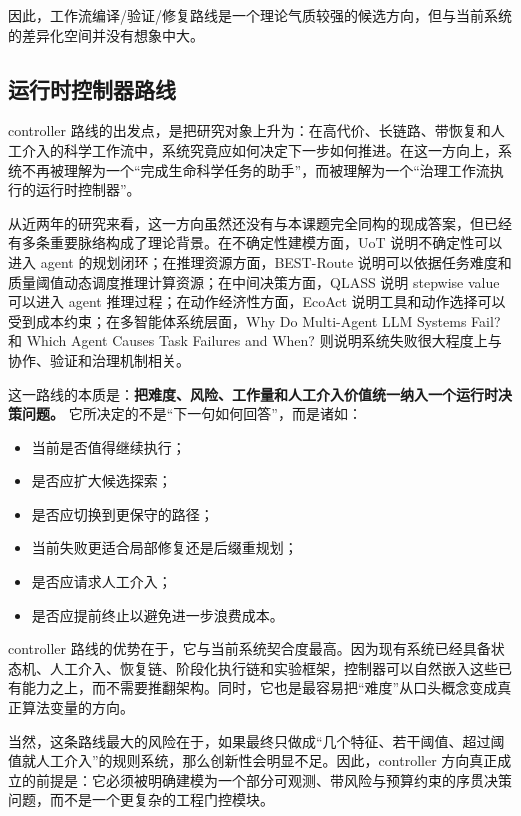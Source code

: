 因此，工作流编译/验证/修复路线是一个理论气质较强的候选方向，但与当前系统的差异化空间并没有想象中大。

\subsection{运行时控制器路线}

controller 路线的出发点，是把研究对象上升为：在高代价、长链路、带恢复和人工介入的科学工作流中，系统究竟应如何决定下一步如何推进。在这一方向上，系统不再被理解为一个“完成生命科学任务的助手”，而被理解为一个“治理工作流执行的运行时控制器”。

从近两年的研究来看，这一方向虽然还没有与本课题完全同构的现成答案，但已经有多条重要脉络构成了理论背景。在不确定性建模方面，UoT 说明不确定性可以进入 agent 的规划闭环\parencite{uot}；在推理资源方面，BEST-Route 说明可以依据任务难度和质量阈值动态调度推理计算资源\parencite{best-route}；在中间决策方面，QLASS 说明 stepwise value 可以进入 agent 推理过程\parencite{qlass}；在动作经济性方面，EcoAct 说明工具和动作选择可以受到成本约束\parencite{ecoact}；在多智能体系统层面，Why Do Multi-Agent LLM Systems Fail? 和 Which Agent Causes Task Failures and When? 则说明系统失败很大程度上与协作、验证和治理机制相关\parencite{whyfail,whichandwhen}。

这一路线的本质是：\textbf{把难度、风险、工作量和人工介入价值统一纳入一个运行时决策问题。} 它所决定的不是“下一句如何回答”，而是诸如：
\begin{itemize}
	\item 当前是否值得继续执行；
	\item 是否应扩大候选探索；
	\item 是否应切换到更保守的路径；
	\item 当前失败更适合局部修复还是后缀重规划；
	\item 是否应请求人工介入；
	\item 是否应提前终止以避免进一步浪费成本。
\end{itemize}

controller 路线的优势在于，它与当前系统契合度最高。因为现有系统已经具备状态机、人工介入、恢复链、阶段化执行链和实验框架，控制器可以自然嵌入这些已有能力之上，而不需要推翻架构。同时，它也是最容易把“难度”从口头概念变成真正算法变量的方向。

当然，这条路线最大的风险在于，如果最终只做成“几个特征、若干阈值、超过阈值就人工介入”的规则系统，那么创新性会明显不足。因此，controller 方向真正成立的前提是：它必须被明确建模为一个部分可观测、带风险与预算约束的序贯决策问题，而不是一个更复杂的工程门控模块。

